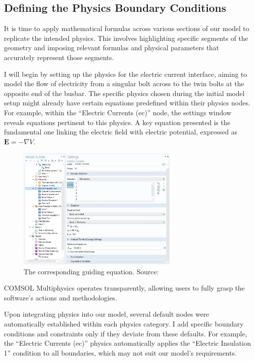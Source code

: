 \subsection{Defining the Physics Boundary Conditions}
It is time to apply mathematical formulas across various sections of our model to replicate the intended physics. This involves highlighting specific segments of the geometry and imposing relevant formulas and physical parameters that accurately represent those segments.

I will begin by setting up the physics for the electric current interface, aiming to model the flow of electricity from a singular bolt across to the twin bolts at the opposite end of the busbar. The specific physics chosen during the initial model setup might already have certain equations predefined within their physics nodes. For example, within the ``Electric Currents (ec)'' node, the settings window reveals equations pertinent to this physics. A key equation presented is the fundamental one linking the electric field with electric potential, expressed as $\mathbf{E} = -\nabla V$.

\begin{figure}[H]
  \centering
  \includegraphics[width=0.7\textwidth]{Chapters/Figures/Chapter 3 Figures/Electrical Currents Physics Equation.png}
  \caption{The corresponding guiding equation. Source: \cite{multiphysics__modeling_nodate}}
  \label{fig:the guiding equation}
\end{figure}

COMSOL Multiphysics operates transparently, allowing users to fully grasp the software's actions and methodologies.

Upon integrating physics into our model, several default nodes were automatically established within each physics category. I add specific boundary conditions and constraints only if they deviate from these defaults. For example, the ``Electric Currents (ec)'' physics automatically applies the ``Electric Insulation 1'' condition to all boundaries, which may not suit our model's requirements.

